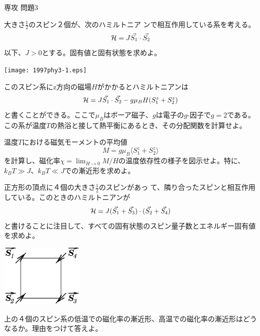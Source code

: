 \documentclass[fleqn]{jbook}
\begin{document}
\begin{question}{専攻 問題3}{}

\begin{subquestions}
\SubQuestion

\parbox[t]{110mm}{大きさ$\frac{1}{2}$のスピン２個が、次のハミルトニア
ンで相互作用している系を考える。
\[ {\cal{H}}=J\vec{S_1}\cdot\vec{S_2}\]
以下、$J>0$とする。固有値と固有状態を求めよ。}\parbox[t]{50mm}{\vspace*{-10mm}
\begin{center}
\texttt{[image: 1997phy3-1.eps]}
\end{center}
}

\SubQuestion
このスピン系にz方向の磁場$H$がかかるとハミルトニアンは
\[ {\cal{H}}=J\vec{S_1}\cdot\vec{S_2}-g\mu_B H(S_1^z+S_2^z) \]
と書くことができる。ここで$\mu_B$はボーア磁子、$g$は電子の$g$-因子で$g=2$である。この系が温度$T$の熱浴と接して熱平衡にあるとき、その分配関数を計算せよ。

\SubQuestion
温度$T$における磁気モーメントの平均値
\[ M=g\mu_B\langle S_1^z+S_2^z\rangle \]
を計算し、磁化率$\chi=\lim_{H\rightarrow 0}M/H$の温度依存性の様子を図示せよ。特に、$k_B T\gg J$、$k_B T\ll J$での漸近形を求めよ。

\SubQuestion

\parbox[t]{100mm}{正方形の頂点に４個の大きさ$\frac{1}{2}$のスピンがあっ
て、隣り合ったスピンと相互作用している。このときのハミルトニアンが
\[ {\cal{H}}=J(\vec{S_1}+\vec{S_3})\cdot(\vec{S_2}+\vec{S_4})\]
と書けることに注目して、すべての固有状態のスピン量子数とエネルギー固有値を求めよ。}\parbox[t]{60mm}{\vspace*{-10mm}
\begin{center}
\includegraphics[clip,height=30mm,width=40mm]{1997phy3-2.eps}
\end{center}
}
\SubQuestion
上の４個のスピン系の低温での磁化率の漸近形、高温での磁化率の漸近形はどうなるか。理由をつけて答えよ。

\end{subquestions}
\end{question}
\end{document}
